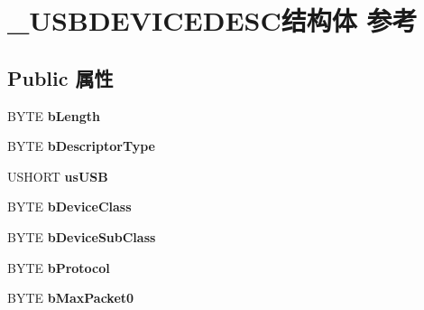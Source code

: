 \hypertarget{struct___u_s_b_d_e_v_i_c_e_d_e_s_c}{}\section{\+\_\+\+U\+S\+B\+D\+E\+V\+I\+C\+E\+D\+E\+S\+C结构体 参考}
\label{struct___u_s_b_d_e_v_i_c_e_d_e_s_c}
\subsection*{Public 属性}
\begin{DoxyCompactItemize}
\item 
\mbox{\label{struct___u_s_b_d_e_v_i_c_e_d_e_s_c_a73bcd0d1abcf5e78684e34a703f9cc12}} 
B\+Y\+TE {\bfseries b\+Length}
\item 
\mbox{\label{struct___u_s_b_d_e_v_i_c_e_d_e_s_c_acd50e0532063d51a114324921b3354f4}} 
B\+Y\+TE {\bfseries b\+Descriptor\+Type}
\item 
\mbox{\label{struct___u_s_b_d_e_v_i_c_e_d_e_s_c_a62b4131409bd6f3954f4d4d9f04b7b4d}} 
U\+S\+H\+O\+RT {\bfseries us\+U\+SB}
\item 
\mbox{\label{struct___u_s_b_d_e_v_i_c_e_d_e_s_c_a6db41c8db13d8525f0652563c843ad7a}} 
B\+Y\+TE {\bfseries b\+Device\+Class}
\item 
\mbox{\label{struct___u_s_b_d_e_v_i_c_e_d_e_s_c_a58a5c2c15ba13a6a68c8a283349f232f}} 
B\+Y\+TE {\bfseries b\+Device\+Sub\+Class}
\item 
\mbox{\label{struct___u_s_b_d_e_v_i_c_e_d_e_s_c_a88cb98904c3141d3fee9f07ea9ea905f}} 
B\+Y\+TE {\bfseries b\+Protocol}
\item 
\mbox{\label{struct___u_s_b_d_e_v_i_c_e_d_e_s_c_a4e7bb2bf624ebd6c7b9cdec91727b411}} 
B\+Y\+TE {\bfseries b\+Max\+Packet0}
\item 
\mbox{\label{struct___u_s_b_d_e_v_i_c_e_d_e_s_c_a9c8a858f910825a28ec314bfe3b1295d}} 

\end{DoxyCompactItemize}

